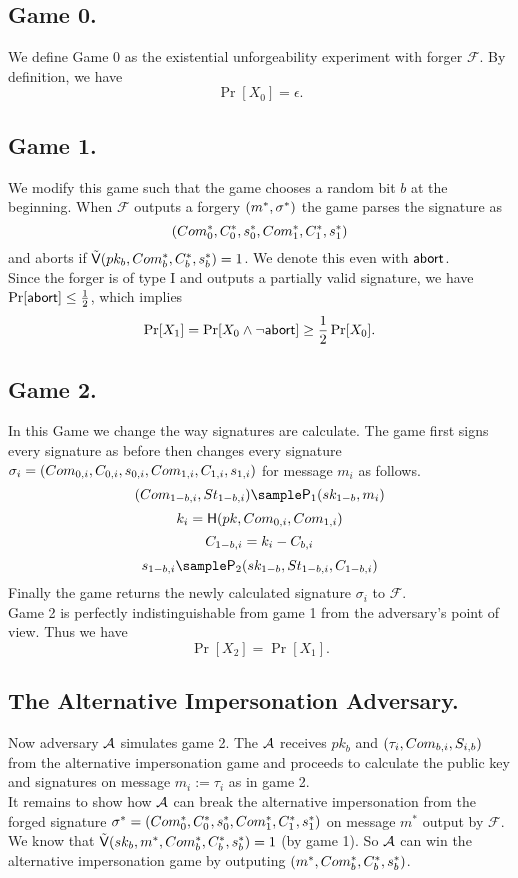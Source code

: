 \subsection*{Game 0.}
We define Game 0 as the existential unforgeability experiment with forger $\mathcal{F}$. By definition, we have
$$\Pr[X_0] = \epsilon.$$

\subsection*{Game 1.}
We modify this game such that the game chooses a random bit $b$ at the beginning. When $\mathcal{F}$ outputs a forgery  $(m^*, \sigma^*)$ the game parses the signature as 
$$(Com^*_{0},C^*_{0},s^*_{0}, Com^*_{1}, C^*_{1},s^*_{1})$$
 and aborts if 
$\tilde{\mathsf{V}}(pk_b,Com^*_b,C^*_b,s^*_b) =1$. We denote this even with $\mathsf{abort}$.
\\
Since the forger is of type I and outputs a partially valid signature, we have
$\Pr[\mathsf{abort}] \leq \frac{1}{2}$, which implies
$$\Pr[X_1] = \Pr[X_0 \land \neg \mathsf{abort}] \geq \frac{1}{2} \Pr[X_0].$$

\subsection*{Game 2.}
In this Game we change the way signatures are calculate.
The game first signs every signature as before then changes every signature $\sigma_i = (Com_{0,i},C_{0,i},s_{0,i}, Com_{1,i}, C_{1,i},s_{1,i})$ for message $m_i$ as follows.
$$(\com_{1-b,i},\st_{1-b,i})\sample\IDP_1(\sk_{1-b},\m_i)$$
$$ k_i = \mathsf{H}(pk,Com_{0,i},Com_{1,i}) $$
$$C_{1-b,i} = k_i - C_{b,i} $$
$$\s_{1-b,i} \sample\IDP_2(\sk_{1-b},\st_{1-b,i},\c_{1-b,i})$$
Finally the game returns the newly calculated signature $\sigma_i$ to $\mathcal{F}$.
\\
Game 2 is perfectly indistinguishable from game 1 from the adversary's point of view. Thus we have
$$\Pr[X_2] = \Pr[X_1].$$

\subsection*{The Alternative Impersonation Adversary.}
Now adversary $\mathcal{A}$ simulates game 2. The $\mathcal{A}$ receives $pk_{b}$ and $(\tau_i, Com_{b,i}, S_{i,b})$ from the alternative impersonation game and proceeds to calculate the public key and signatures on message $m_i := \tau_i$ as in game 2.
\\
It remains to show how $\mathcal{A}$ can break the alternative impersonation from the forged signature
$\sigma^* = (Com^*_{0},C^*_{0},s^*_{0}, Com^*_{1}, C^*_{1},s^*_{1})$ on message $m^*$ output by $\mathcal{F}$. We know that $\tilde{\mathsf{V}}(sk_b,m^*,Com^*_b,C^*_b,s^*_b) =1$ (by game 1).  So $\mathcal{A}$ can win the alternative impersonation game by outputing $(m^*,Com^*_b,C^*_b,s^*_b)$.

